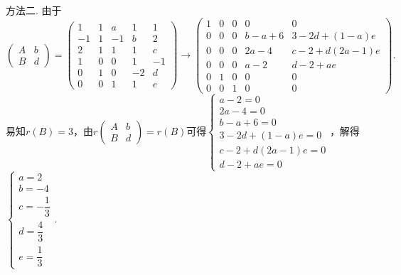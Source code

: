 \begin{enumerate}
          方法二. 由于
          \[\begin{pmatrix}
                  A & b \\
                  B & d
              \end{pmatrix}=
              \begin{pmatrix}
                  1  & 1 & a  & 1  & 1  \\
                  -1 & 1 & -1 & b  & 2  \\
                  2  & 1 & 1  & 1  & c  \\
                  1  & 0 & 0  & 1  & -1 \\
                  0  & 1 & 0  & -2 & d  \\
                  0  & 0 & 1  & 1  & e
              \end{pmatrix}\rightarrow
              \begin{pmatrix}
                  1 & 0 & 0 & 0     & 0            \\
                  0 & 0 & 0 & b-a+6 & 3-2d+(1-a)e  \\
                  0 & 0 & 0 & 2a-4  & c-2+d(2a-1)e \\
                  0 & 0 & 0 & a-2   & d-2+ae       \\
                  0 & 1 & 0 & 0     & 0            \\
                  0 & 0 & 1 & 0     & 0
              \end{pmatrix}.\]
          易知$r(B)=3$，由$r\begin{pmatrix}
                  A & b \\
                  B & d
              \end{pmatrix}=r(B)$可得$\begin{cases}
                  a-2=0          \\
                  2a-4=0         \\
                  b-a+6=0        \\
                  3-2d+(1-a)e=0  \\
                  c-2+d(2a-1)e=0 \\
                  d-2+ae=0
              \end{cases}$，解得$\begin{cases}
                  a=2          \\
                  b=-4         \\
                  c=-\dfrac 13 \\[1ex]
                  d=\dfrac 43  \\[1ex]
                  e=\dfrac 13
              \end{cases}$.


\end{enumerate}
